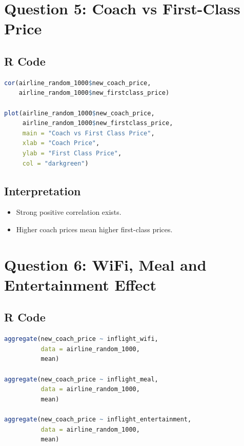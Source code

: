 \documentclass[12pt,a4paper]{article}
\begin{document}

\section{Question 5: Coach vs First-Class Price}

\subsection{R Code}

\begin{lstlisting}[language=R]
cor(airline_random_1000$new_coach_price,
    airline_random_1000$new_firstclass_price)

plot(airline_random_1000$new_coach_price,
     airline_random_1000$new_firstclass_price,
     main = "Coach vs First Class Price",
     xlab = "Coach Price",
     ylab = "First Class Price",
     col = "darkgreen")
\end{lstlisting}

\subsection{Interpretation}

\begin{itemize}
\item Strong positive correlation exists.
\item Higher coach prices mean higher first-class prices.
\end{itemize}


\section{Question 6: WiFi, Meal and Entertainment Effect}

\subsection{R Code}

\begin{lstlisting}[language=R]
aggregate(new_coach_price ~ inflight_wifi,
          data = airline_random_1000,
          mean)

aggregate(new_coach_price ~ inflight_meal,
          data = airline_random_1000,
          mean)

aggregate(new_coach_price ~ inflight_entertainment,
          data = airline_random_1000,
          mean)
\end{lstlisting}
\end{document}

